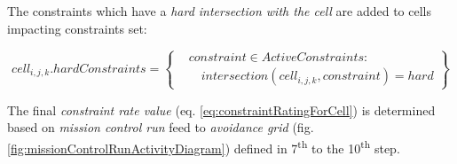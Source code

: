 \noindent The constraints which have a \emph{hard intersection with the cell} are added to cells impacting constraints set:

\begin{equation}\label{eq:hardConstraintsCellIntersections}
    cell_{i,j,k}. hard Constraints = 
    \left\{
        \begin{aligned}
            &constraint \in Active Constraints:\\ 
            &\quad intersection(cell_{i,j,k},constraint) = hard
        \end{aligned}
    \right\}
\end{equation}

\begin{note}
    The final \emph{constraint rate value} (eq. \ref{eq:constraintRatingForCell}) is determined based on \emph{mission control run} feed to \emph{avoidance grid} (fig. \ref{fig:missionControlRunActivityDiagram}) defined in  7\textsuperscript{th} to the 10\textsuperscript{th} step.
\end{note}
    
